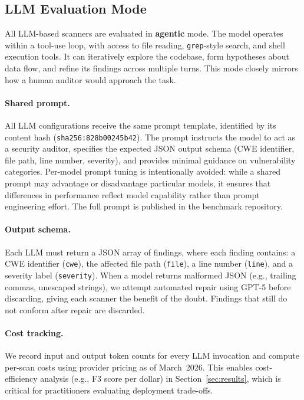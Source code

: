 \subsection{LLM Evaluation Mode}
\label{sec:llm-modes}

All LLM-based scanners are evaluated in \textbf{agentic} mode.
The model operates within a tool-use loop, with access to file reading,
\texttt{grep}-style search, and shell execution tools. It can
iteratively explore the codebase, form hypotheses about data flow, and
refine its findings across multiple turns. This mode closely mirrors
how a human auditor would approach the task.

\paragraph{Shared prompt.}
All LLM configurations receive the same prompt template, identified by
its content hash (\texttt{sha256:828b00245b42}). The prompt instructs
the model to act as a security auditor, specifies the expected JSON
output schema (CWE identifier, file path, line number, severity), and
provides minimal guidance on vulnerability categories. Per-model prompt
tuning is intentionally avoided: while a shared prompt may
advantage or disadvantage particular models, it ensures that differences
in performance reflect model capability rather than prompt engineering
effort. The full prompt is published in the benchmark repository.

\paragraph{Output schema.}
Each LLM must return a JSON array of findings, where each finding
contains: a CWE identifier (\texttt{cwe}), the affected file path
(\texttt{file}), a line number (\texttt{line}), and a severity label
(\texttt{severity}). When a model returns malformed JSON (e.g., trailing commas, unescaped strings), we attempt automated repair using GPT-5 before discarding, giving each scanner the benefit of the doubt. Findings that still do not conform after repair are discarded.

\paragraph{Cost tracking.}
We record input and output token counts for every LLM invocation and
compute per-scan costs using provider pricing as of March~2026. This
enables cost-efficiency analysis (e.g., F3 score per dollar) in
Section~\ref{sec:results}, which is critical for practitioners
evaluating deployment trade-offs.


